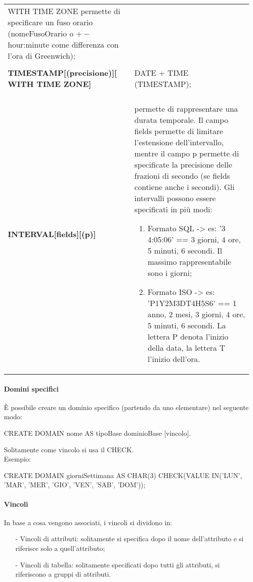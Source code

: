 \documentclass[a4paper, 10pt]{report}
\begin{document}
\begin{longtable}{ p{}  p{}}
WITH TIME ZONE permette di specificare un fuso orario (nomeFusoOrario o $+-$hour:minute come differenza con l'ora di Greenwich);
\\\\
  \textbf{TIMESTAMP[(precisione)][ WITH TIME ZONE]} & DATE + TIME (TIMESTAMP);
\\\\
 \textbf{INTERVAL[fields][(p)]} & permette di rappresentare una durata temporale. Il campo fields permette di limitare l'estensione dell'intervallo, mentre il campo p permette di specificate la precisione delle frazioni di secondo (se fields contiene anche i secondi). Gli intervalli possono essere specificati in più modi:
	\begin{enumerate}
	\item Formato SQL -> es: '3 4:05:06' == 3 giorni, 4 ore, 5 minuti, 6 secondi. Il massimo rappresentabile sono i giorni;
	\item Formato ISO -> es: 'P1Y2M3DT4H5S6' == 1 anno, 2 mesi, 3 giorni, 4 ore, 5 minuti, 6 secondi. La lettera P denota l'inizio della data, la lettera T l'inizio dell'ora.
\end{enumerate}
\end{longtable}
	
\paragraph*{Domini specifici} È possibile creare un dominio specifico (partendo da uno elementare) nel seguente modo:
\begin{code}
		CREATE DOMAIN nome AS tipoBase dominioBase
			[vincolo].
\end{code}
\noindent Solitamente come vincolo si usa il CHECK.
\\

\noindent Esempio:
\begin{code}
		CREATE DOMAIN giorniSettimana AS CHAR(3) 
			CHECK(VALUE IN('LUN', 'MAR', 'MER', 'GIO', 'VEN', 'SAB', 'DOM'));
\end{code}

\paragraph*{Vincoli} In base a cosa vengono associati, i vincoli si dividono in:
\begin{itemize}
\item[-] Vincoli di attributi: solitamente si specifica dopo il nome dell'attributo e si riferisce solo a quell'attributo;
\item[-] Vincoli di tabella: solitamente specificati dopo tutti gli attributi, si riferiscono a gruppi di attributi.
\end{itemize}
\end{document}
